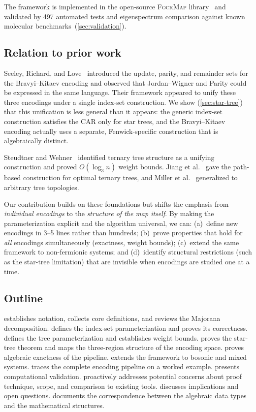 The framework is implemented in the open-source \textsc{FockMap}
library~\cite{fockmap2026} and validated by 497 automated tests and
eigenspectrum comparison against known molecular
benchmarks~(\cref{sec:validation}).

\subsection{Relation to prior work}

Seeley, Richard, and Love~\cite{seeley2012} introduced the update,
parity, and remainder sets for the Bravyi--Kitaev encoding and observed
that Jordan--Wigner and Parity could be expressed in the same language.
Their framework appeared to unify these three encodings under a single
index-set construction.  We show (\cref{sec:star-tree}) that this
unification is less general than it appears: the generic index-set
construction satisfies the CAR only for star trees, and the
Bravyi--Kitaev encoding actually uses a separate, Fenwick-specific
construction that is algebraically distinct.

Steudtner and Wehner~\cite{steudtner2018} identified ternary tree
structure as a unifying construction and proved $O(\log_3 n)$ weight
bounds.  Jiang et al.~\cite{jiang2020} gave the path-based
construction for optimal ternary trees, and Miller et
al.~\cite{miller2023bonsai} generalized to arbitrary tree topologies.

Our contribution builds on these foundations but shifts the emphasis
from \emph{individual encodings} to the \emph{structure of the map
itself}.  By making the parameterization explicit and the algorithm
universal, we can: (a)~define new encodings in 3--5 lines rather than
hundreds; (b)~prove properties that hold for \emph{all} encodings
simultaneously (exactness, weight bounds); (c)~extend the same
framework to non-fermionic systems; and (d)~identify structural
restrictions (such as the star-tree limitation) that are invisible when
encodings are studied one at a time.

\subsection{Outline}

 establishes notation, collects core definitions,
and reviews the Majorana decomposition.   defines
the index-set parameterization and proves its correctness.
 defines the tree parameterization and
establishes weight bounds.   proves the star-tree
theorem and maps the three-region structure of the encoding space.
 proves algebraic exactness of the pipeline.
 extends the framework to bosonic and mixed
systems.   traces the complete encoding pipeline
on a worked example.   presents computational
validation.   proactively addresses potential
concerns about proof technique, scope, and comparison to existing
tools.   discusses implications and open
questions.   documents the correspondence between
the algebraic data types and the mathematical structures.
